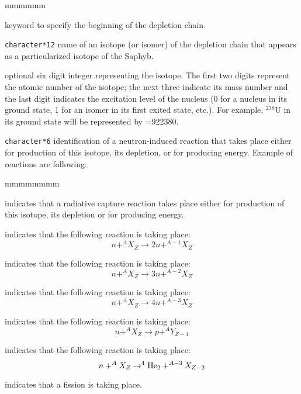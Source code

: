 \begin{ListeDeDescription}{mmmmmm}

\item[\moc{CHAIN}] keyword to specify the beginning of the depletion chain.

\item[\dusa{NAMDPL}] {\tt character*12} name of an isotope (or isomer) of the
depletion chain that appears as a particularized isotope of the Saphyb.

\item[\dusa{izae}] optional six digit integer representing the isotope. The first two
digits represent the atomic number of the isotope; the next three indicate its
mass number and the last digit indicates the  excitation level of the nucleus (0
for a nucleus in its ground state, 1 for an isomer in its first exited state,
etc.). For example, $^{238}$U in its ground state will be represented by
=922380.

\item[\dusa{reaction}] {\tt character*6} identification of a neutron-induced
reaction that takes place either for production of this isotope, its depletion,
or for producing energy. Example of reactions are following:

\begin{ListeDeDescription}{mmmmmmmm}
\item[\moc{NG}] indicates that a radiative capture reaction takes place either
for production of this isotope, its depletion or for producing energy.

\item[\moc{N2N}] indicates that the following reaction is taking place:
$$ n +^{A}X_Z \to 2 n + ^{A-1}X_Z$$

\item[\moc{N3N}] indicates that the following reaction is taking place:
$$ n +^{A}X_Z \to 3 n + ^{A-2}X_Z$$

\item[\moc{N4N}] indicates that the following reaction is taking place:
$$ n +^{A}X_Z \to 4 n + ^{A-3}X_Z$$

\item[\moc{NP}] indicates that the following reaction is taking place:
$$ n +^{A}X_Z \to p + ^AY_{Z-1}$$

\item[\moc{NA}] indicates that the following reaction is taking place:
$$ n +^{A}X_Z \to ^4{\rm He}_2 + ^{A-3}X_{Z-2}$$

\item[\moc{NFTOT}] indicates that a fission is taking place.
\end{ListeDeDescription}


\end{ListeDeDescription}
